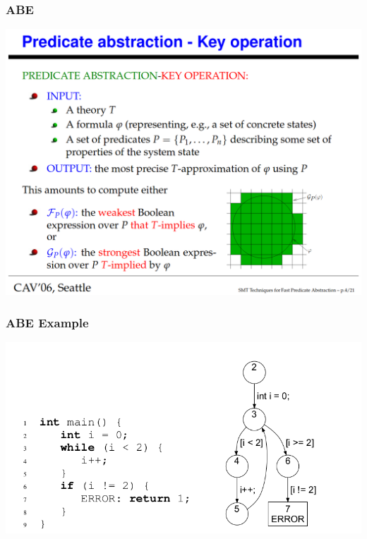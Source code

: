 \documentclass[11pt]{beamer}
\begin{document}
\begin{frame}\frametitle{ABE}
\begin{center}
\includegraphics[scale=0.27]{pa.png}
\end{center}
\end{frame}

\begin{frame}\frametitle{ABE Example}

\begin{center}
\includegraphics[scale=0.36]{cfa.png}
\end{center}

\end{frame}
\end{document}
